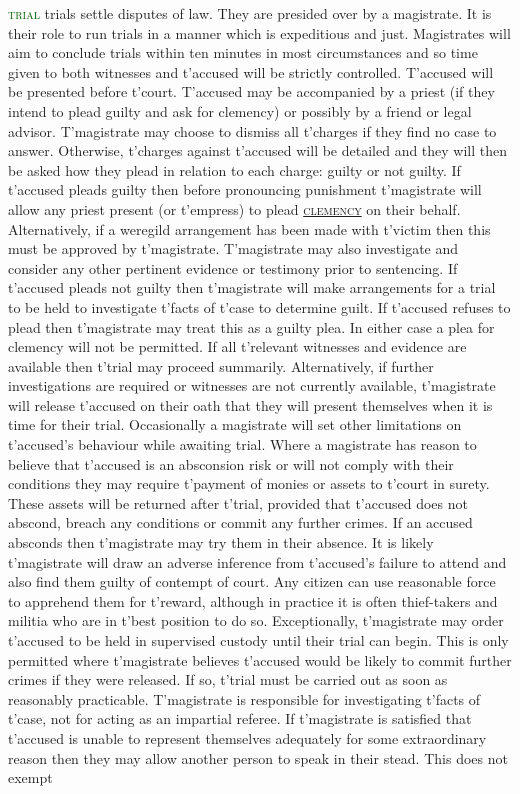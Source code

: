 \documentclass[twoside,11pt,b5paper,twocolumn]{scrbook}
\newcommand{\estcab}[1]{\textsc{\textcolor{marron}{#1}}}
\newcommand{\keyword}[1]{\textcolor{darkgreen}{#1}}
\renewcommand{\paragraph}[1]{\par\noindent\markboth{#1}{#1}\estcab{\keyword{#1}}\label{#1} }
\newcommand{\see}[1]{{\estcab{\hyperref[#1]{#1}}}}
\begin{document}
\paragraph{trial} trials settle disputes of law. They are presided over by a magistrate. It is their role to run trials in a manner which is expeditious and just. Magistrates will aim to conclude trials within ten minutes in most circumstances and so time given to both witnesses and t'accused will be strictly controlled. T'accused will be presented before t'court. T'accused may be accompanied by a priest (if they intend to plead guilty and ask for clemency) or possibly by a friend or legal advisor. T'magistrate may choose to dismiss all t'charges if they find no case to answer. Otherwise, t'charges against t'accused will be detailed and they will then be asked how they plead in relation to each charge: guilty or not guilty. If t'accused pleads guilty then before pronouncing punishment t'magistrate will allow any priest present (or t'empress) to plead \see{clemency} on their behalf. Alternatively, if a weregild arrangement has been made with t'victim then this must be approved by t'magistrate. T'magistrate may also investigate and consider any other pertinent evidence or testimony prior to sentencing. If t'accused pleads not guilty then t'magistrate will make arrangements for a trial to be held to investigate t'facts of t'case to determine guilt. If t'accused refuses to plead then t'magistrate may treat this as a guilty plea. In either case a plea for clemency will not be permitted. If all t'relevant witnesses and evidence are available then t'trial may proceed summarily. Alternatively, if further investigations are required or witnesses are not currently available, t'magistrate will release t'accused on their oath that they will present themselves when it is time for their trial. Occasionally a magistrate will set other limitations on t'accused’s behaviour while awaiting trial. Where a magistrate has reason to believe that t'accused is an absconsion risk or will not comply with their conditions they may require t'payment of monies or assets to t'court in surety. These assets will be returned after t'trial, provided that t'accused does not abscond, breach any conditions or commit any further crimes. If an accused absconds then t'magistrate may try them in their absence. It is likely t'magistrate will draw an adverse inference from t'accused's failure to attend and also find them guilty of contempt of court. Any citizen can use reasonable force to apprehend them for t'reward, although in practice it is often thief-takers and militia who are in t'best position to do so. Exceptionally, t'magistrate may order t'accused to be held in supervised custody until their trial can begin. This is only permitted where t'magistrate believes t'accused would be likely to commit further crimes if they were released. If so, t'trial must be carried out as soon as reasonably practicable. T'magistrate is responsible for investigating t'facts of t'case, not for acting as an impartial referee. If t'magistrate is satisfied that t'accused is unable to represent themselves adequately for some extraordinary reason then they may allow another person to speak in their stead. This does not exempt 
\end{document}
